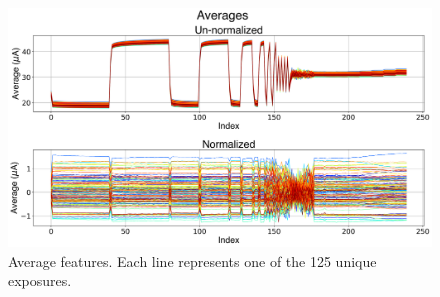 \begin{figure}[h]
	\centering
	\includegraphics[width=1\textwidth]{../figures/averages.png}
	\caption{Average features. Each line represents one of the 125 unique exposures.}
	\label{fig:averages}
\end{figure}


